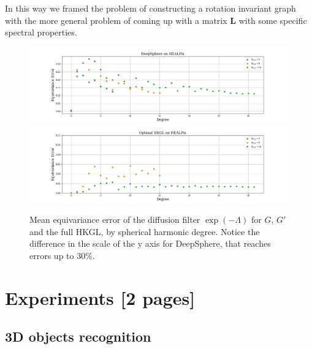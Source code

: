 \documentclass{article} %
\newcommand{\todo}[1]{{\color[rgb]{.6,.1,.6}{#1}}}
\begin{document}
In this way we framed the problem of constructing a rotation invariant graph with the more general problem of coming up with a matrix $\mathbf L$ with some specific spectral properties.

\begin{figure}
	\centering
	\includegraphics[width=\textwidth]{DeepSphereonHEALPix.png}
	\includegraphics[width=\textwidth]{OptimalHKGLonHEALPix.png}
	\caption{\label{fig:DeepSphere equivariance error}Mean equivariance error of the diffusion filter $\exp(-\Lambda)$ for $G$, $G'$ and the full HKGL, by spherical harmonic degree. Notice the difference in the scale of the y axis for DeepSphere, that reaches errors up to 30\%.}
\end{figure}

\section{Experiments [2 pages]}

\todo{
Show: \\
* meet the desiderata \\
* DeepSphere V1 and V2 are equivalent in practice, wait on SHREC and cosmo exp \\
* anisotropy doesn't help \\
}

\subsection{3D objects recognition}

\todo{
* same perf as other spherical CNNs, but 40 times faster \\
* compare samplings (equi, HEALPix) $\Rightarrow$ not much difference \\
* compare with improved graph (Nside=32) $\Rightarrow$ no improvement as information in the low frequencies (PSD, and works down to nside=8) \\
* ModelNet 40: same conclusions $\Rightarrow$ appendix \\
}
\end{document}
